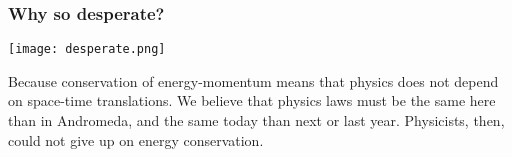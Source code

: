 \begin{frame}
\frametitle{Why so desperate?}

\texttt{[image: desperate.png]}
 

\begin{block}{}
Because conservation of energy-momentum means that physics does not depend on space-time translations. We believe that physics laws must be the same here than in Andromeda, and the same today than next or last year. Physicists, then, could not give up on energy conservation.

\end{block}

\end{frame}
